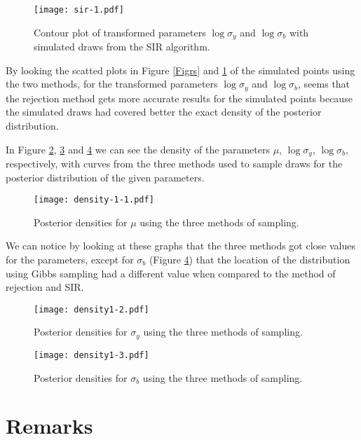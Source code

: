 \documentclass{asaproc}
\begin{document}
\begin{figure}[H]
\centering
\caption{Contour plot of transformed parameters $\log\sigma_y$ and $\log\sigma_b$ with simulated draws  from the SIR algorithm.}
\label{Figsir}
\texttt{[image: sir-1.pdf]}
\end{figure}

By looking the scatted plots in Figure \ref{Figrs} and \ref{Figsir} of the simulated points using the two methods, for the transformed parameters $\log\sigma_y$ and $\log\sigma_b$, seems that the rejection method gets more accurate results for the simulated points because the simulated draws had covered better the exact density of the posterior distribution.

In Figure \ref{Fig6}, \ref{Fig7} and \ref{Fig8} we can see the density of the parameters $\mu$, $\log\sigma_y$, $\log\sigma_b$, respectively, with curves from the three methods used to sample draws for the posterior distribution of the given parameters.

\begin{figure}[H]
\centering
\caption{Posterior densities for $\mu$ using the three methods of sampling.}
\label{Fig6}
\texttt{[image: density-1-1.pdf]}
\end{figure}

We can notice by looking at these graphs that the three methods got close values for the parameters, except for $\sigma_b$ (Figure \ref{Fig8}) that the location of the distribution using Gibbs sampling had a different value when compared to the method of rejection and SIR.


\begin{figure}[H]
\centering
\caption{ Posterior densities for $\sigma_y$ using the three methods of sampling.}
\label{Fig7}
\texttt{[image: density1-2.pdf]}
\end{figure}

\begin{figure}[H]
\centering
\caption{ Posterior densities for $\sigma_b$ using the three methods of sampling.}
\label{Fig8}
\texttt{[image: density1-3.pdf]}
\end{figure}

\vfill

\section{Remarks}
\end{document}
